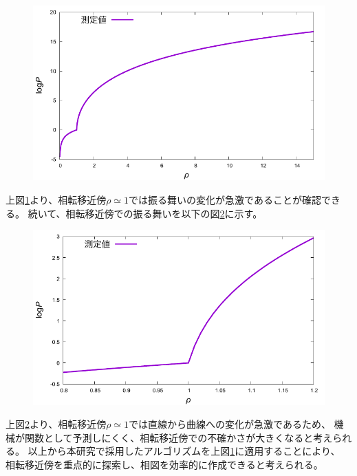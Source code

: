 \documentclass[titlepage]{jsreport}
\begin{document}
{{{\begin{figure}[htbp]
    \begin{center}
        \includegraphics[width=13.5cm]{fig/logarithm_den-pre.pdf}
    \end{center}
    \caption{}
    \label{fig:logarithm_den-pre}
\end{figure}

\newpage
上図\ref{fig:logarithm_den-pre}より、相転移近傍${\rho}\simeq{1}$では振る舞いの変化が急激であることが確認できる。
続いて、相転移近傍での振る舞いを以下の図\ref{fig:middleden-logarithm_den-pre}に示す。

\begin{figure}[htbp]
    \begin{center}
        \includegraphics[width=13.5cm]{fig/middleden-logarithm_den-pre.pdf}
    \end{center}
    \caption{}
    \label{fig:middleden-logarithm_den-pre}
\end{figure}

\newpage
上図\ref{fig:middleden-logarithm_den-pre}より、相転移近傍${\rho}\simeq{1}$では直線から曲線への変化が急激であるため、
機械が関数として予測しにくく、相転移近傍での不確かさが大きくなると考えられる。
以上から本研究で採用したアルゴリズムを上図\ref{fig:logarithm_den-pre}に適用することにより、
相転移近傍を重点的に探索し、相図を効率的に作成できると考えられる。


}}}
\end{document}
